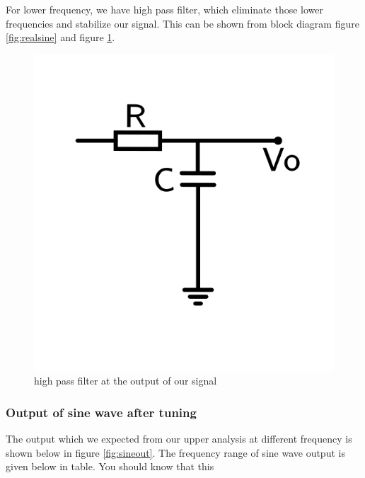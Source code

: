 \documentclass[14pt,a4paper]{extarticle}
\begin{document}
For lower frequency, we have high pass filter, which eliminate those lower frequencies and stabilize our signal. This can be shown from block diagram figure \ref{fig:realsine} and figure \ref{fig:highpass}.


\begin{figure}[h]
\centering
\includegraphics[width=0.5\linewidth]{imgs/highpassfilter2.png}
\caption{high pass filter at the output of our signal}
\label{fig:highpass}
\end{figure}


\subsubsection{Output of sine wave after tuning}
\label{sec:org3ab34a9}
The output which we expected from our upper analysis at different frequency is shown below in figure \ref{fig:sineout}. The frequency range of sine wave output is given below in table. You should know that this
\end{document}
